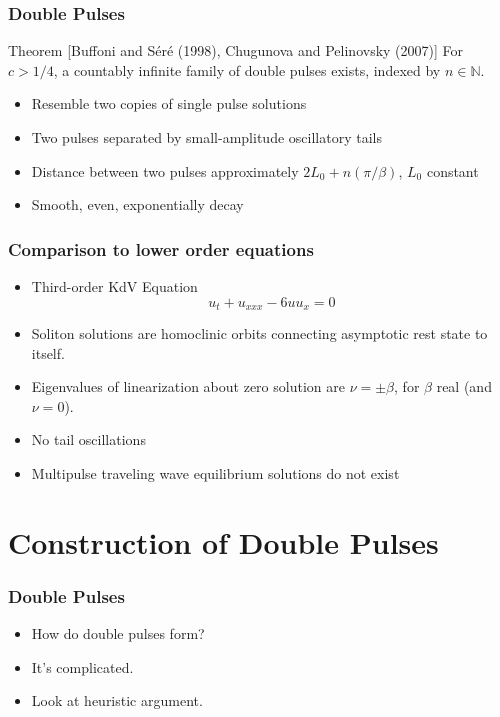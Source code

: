 \documentclass[16pt]{beamer}
\begin{document}
\begin{frame}
	\frametitle{Double Pulses}
	\fontsize{16}{7.2}\selectfont

	\begin{block}{Theorem \footnotesize [Buffoni and S\'er\'e (1998), Chugunova and Pelinovsky (2007)]}
	For $c>1/4$, a countably infinite family of double pulses exists, indexed by $n \in \mathbb{N}$.
	\begin{itemize}
		\item Resemble two copies of single pulse solutions
		\item Two pulses separated by small-amplitude oscillatory tails
		\item Distance between two pulses approximately $2L_0 + n (\pi / \beta)$, $L_0$ constant
		\item Smooth, even, exponentially decay
	\end{itemize}
	\end{block}
\end{frame}

\begin{frame}
	\frametitle{Comparison to lower order equations}
	\fontsize{16}{7.2}\selectfont

	\begin{itemize}
		\item Third-order KdV Equation
		\[
		u_t + u_{xxx} - 6 u u_x = 0
		\]
		\item Soliton solutions are homoclinic orbits connecting asymptotic rest state to itself.
		\item Eigenvalues of linearization about zero solution are $\nu = \pm \beta$, for $\beta$ real (and $\nu = 0$).
		\item No tail oscillations
		\item Multipulse traveling wave equilibrium solutions do not exist
	\end{itemize}

\end{frame}

\section{Construction of Double Pulses}

\begin{frame}
	\frametitle{Double Pulses}
	\fontsize{16}{7.2}\selectfont
	\begin{itemize}
		\item<1->How do double pulses form?
			\vspace{0.5cm}

		\item<2->It's complicated.
			\vspace{0.5cm}

		\item<3->Look at heuristic argument.
	\end{itemize}
\end{frame}
\end{document}
